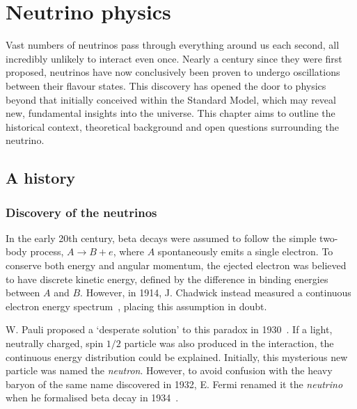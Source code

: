 \chapter{Neutrino physics} %
\label{chap:theory} %

Vast numbers of neutrinos pass through everything around us each second, all incredibly unlikely
to interact even once. Nearly a century since they were first proposed, neutrinos have now
conclusively been proven to undergo oscillations between their flavour states. This discovery has
opened the door to physics beyond that initially conceived within the Standard Model, which may
reveal new, fundamental insights into the universe. This chapter aims to outline the historical
context, theoretical background and open questions surrounding the neutrino.

\section{A history} %
\label{sec:theory_history} %

\subsection{Discovery of the neutrinos} %
\label{sec:theory_history_neutrinos} %

In the early 20th century, beta decays were assumed to follow the simple two-body process,
$A\rightarrow B + e$, where $A$ spontaneously emits a single electron. To conserve both energy and
angular momentum, the ejected electron was believed to have discrete kinetic energy, defined by
the difference in binding energies between $A$ and $B$. However, in 1914, J. Chadwick instead
measured a continuous electron energy spectrum~\cite{chadwick1914}, placing this assumption in
doubt.

W. Pauli proposed a `desperate solution' to this paradox in 1930~\cite{pauli1930}. If a light,
neutrally charged, spin $1/2$ particle was also produced in the interaction, the continuous energy
distribution could be explained. Initially, this mysterious new particle was named the
\emph{neutron}. However, to avoid confusion with the heavy baryon of the same name discovered in
1932, E. Fermi renamed it the \emph{neutrino} when he formalised beta decay in
1934~\cite{fermi1934}.

